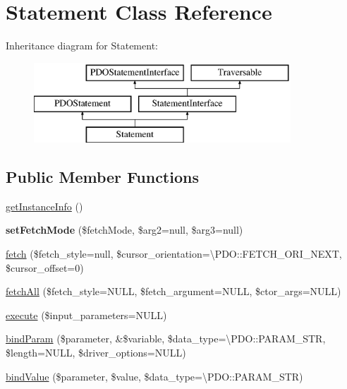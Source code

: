 \hypertarget{class_pes_1_1_database_1_1_statement_1_1_statement}{}\section{Statement Class Reference}
\label{class_pes_1_1_database_1_1_statement_1_1_statement}
Inheritance diagram for Statement\+:\begin{figure}[H]
\begin{center}
\leavevmode
\includegraphics[height=3.000000cm]{class_pes_1_1_database_1_1_statement_1_1_statement}
\end{center}
\end{figure}
\subsection*{Public Member Functions}
\begin{DoxyCompactItemize}
\item 
\mbox{\hyperlink{class_pes_1_1_database_1_1_statement_1_1_statement_ad86fa5498ac1054e414a91fa4a6a7dfd}{get\+Instance\+Info}} ()
\item 
\mbox{\label{class_pes_1_1_database_1_1_statement_1_1_statement_a1dc8694f56e4b9ed603f8c27be444751}} 
{\bfseries set\+Fetch\+Mode} (\$fetch\+Mode, \$arg2=null, \$arg3=null)
\item 
\mbox{\hyperlink{class_pes_1_1_database_1_1_statement_1_1_statement_a5b20a3b5483f33168970c1ff76758042}{fetch}} (\$fetch\+\_\+style=null, \$cursor\+\_\+orientation=\textbackslash{}P\+D\+O\+::\+F\+E\+T\+C\+H\+\_\+\+O\+R\+I\+\_\+\+N\+E\+XT, \$cursor\+\_\+offset=0)
\item 
\mbox{\hyperlink{class_pes_1_1_database_1_1_statement_1_1_statement_ace36703cecd9de1814b68fc8d0e69c73}{fetch\+All}} (\$fetch\+\_\+style=N\+U\+LL, \$fetch\+\_\+argument=N\+U\+LL, \$ctor\+\_\+args=N\+U\+LL)
\item 
\mbox{\hyperlink{class_pes_1_1_database_1_1_statement_1_1_statement_addad8fb3f107b88d79d94550582a4355}{execute}} (\$input\+\_\+parameters=N\+U\+LL)
\item 
\mbox{\hyperlink{class_pes_1_1_database_1_1_statement_1_1_statement_a5b8b69a18923922832bcd98438c28908}{bind\+Param}} (\$parameter, \&\$variable, \$data\+\_\+type=\textbackslash{}P\+D\+O\+::\+P\+A\+R\+A\+M\+\_\+\+S\+TR, \$length=N\+U\+LL, \$driver\+\_\+options=N\+U\+LL)
\item 
\mbox{\hyperlink{class_pes_1_1_database_1_1_statement_1_1_statement_ae35efa31b4405c6db7af0de9add27eb2}{bind\+Value}} (\$parameter, \$value, \$data\+\_\+type=\textbackslash{}P\+D\+O\+::\+P\+A\+R\+A\+M\+\_\+\+S\+TR)
\end{DoxyCompactItemize}
